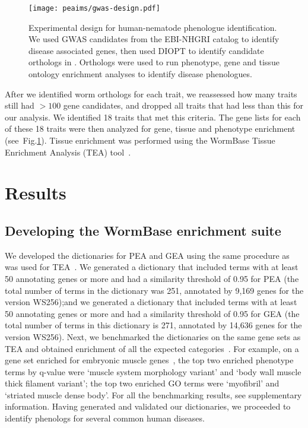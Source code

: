 \begin{figure}[htbp]
  \renewcommand{\familydefault}{\sfdefault}\normalfont{}
  \centering
  \texttt{[image: peaims/gwas-design.pdf]}
  \caption{Experimental design for human-nematode phenologue identification.
           We used GWAS candidates from the EBI-NHGRI catalog to identify
           disease associated genes, then used DIOPT to identify candidate
           orthologs in \cel{}. Orthologs were used to run phenotype, gene
           and tissue ontology enrichment analyses to identify disease
           phenologues.}
\label{fig:gwas}
\end{figure}


After we identified worm orthologs for each trait, we reassessed how many traits
still had $>100$ gene candidates, and dropped all traits that had less than this
for our analysis. We identified 18 traits that met this criteria. The gene
lists for each of these 18 traits were then analyzed for gene, tissue and
phenotype enrichment (see~Fig.\ref{fig:gwas}). Tissue enrichment was
performed using the WormBase Tissue Enrichment Analysis (TEA)
tool~\citep{Angeles-Albores2016}.


\section*{Results}
\subsection*{Developing the WormBase enrichment suite}
We developed the dictionaries for PEA and GEA using the same procedure as was
used for TEA~\citep{Angeles-Albores2016}. We generated a dictionary that
included terms with at
least 50 annotating genes or more and had a similarity threshold of 0.95 for PEA
(the total number of terms in the dictionary was 251, annotated by 9,169 genes
 for the version WS256);\@ and we generated a
dictionary that included terms with at least 50 annotating genes or more and
had a similarity threshold of 0.95 for GEA (the total number of terms in this
dictionary is 271, annotated by 14,636 genes for the version WS256).
\@ Next, we benchmarked the dictionaries on the same gene
sets as TEA and obtained enrichment of all the expected
categories~\citep{Gaudet2004a, Spencer2011, Cinar2005, Watson2008a,
Pauli2006, Portman2004, Fox2007, Smith2010}.
For example,
on a gene set enriched for embryonic muscle genes~\citep{Watson2008a},
the top two enriched
phenotype terms by q-value were `muscle system morphology variant' and `body
wall muscle thick filament variant'; the top two enriched GO terms were
`myofibril' and `striated muscle dense body'. For all the benchmarking
results, see supplementary information. Having generated and validated our
dictionaries, we proceeded to identify phenologs for several common human
diseases.

